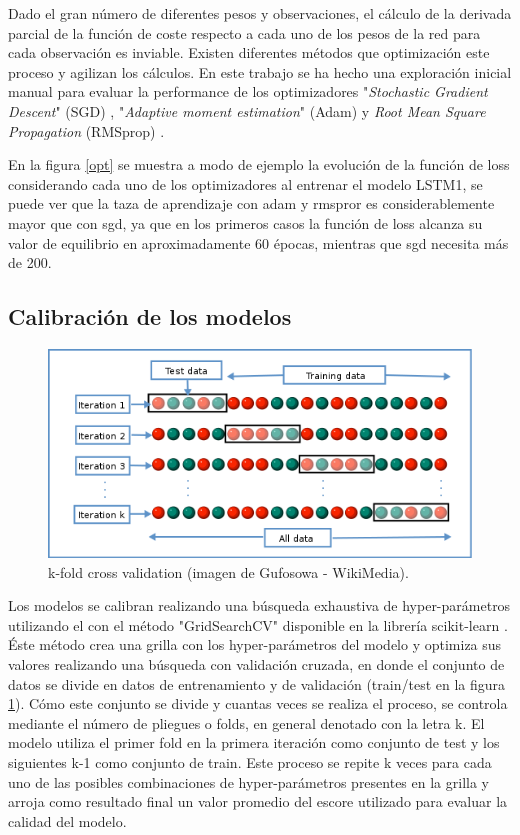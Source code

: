 Dado el gran número de diferentes pesos y observaciones, el cálculo de la derivada parcial de la función de coste 
respecto a cada uno de los pesos de la red para cada observación es inviable. Existen diferentes métodos que optimización
este proceso y agilizan los cálculos. En este trabajo se ha hecho una exploración inicial manual para evaluar 
la performance de los optimizadores 
"\textit{Stochastic Gradient Descent}" (SGD) \cite{optim}, "\textit{Adaptive moment estimation}" (Adam) \cite{adam} y 
\textit{Root Mean Square Propagation} (RMSprop) \cite{optim}.



En la figura \ref{opt} se muestra a modo de ejemplo la evolución de la función de loss considerando cada uno de los 
optimizadores al entrenar el modelo LSTM1, se puede ver que la taza de aprendizaje con adam y rmspror es considerablemente
mayor que con sgd, ya que en los primeros casos la función de loss alcanza su valor de equilibrio en aproximadamente 
60 épocas, mientras que sgd necesita más de 200. 



\subsection{Calibración de los modelos}
\label{cal}

\begin{figure}[h!]
  \begin{center}
    \includegraphics[height=2.in]{Figures/GridsearchCV.png}
    \caption{ k-fold cross validation (imagen de Gufosowa - WikiMedia).}
    \label{KCV}
  \end{center}
\end{figure}


Los modelos se calibran realizando una búsqueda exhaustiva de hyper-parámetros utilizando el 
con el método "GridSearchCV" disponible en la librería scikit-learn \cite{scikit}.
Éste método crea una grilla con los hyper-parámetros del modelo y optimiza sus valores realizando una búsqueda
 con validación cruzada, en donde el conjunto de datos se divide en datos de entrenamiento y de validación 
 (train/test en la figura \ref{KCV}).  Cómo este conjunto se divide y cuantas veces se realiza el proceso, se controla mediante el 
 número de pliegues o folds, en general denotado con la letra k.
 El modelo utiliza el primer fold en la primera iteración como conjunto de test y 
 los siguientes k-1 como conjunto de train. Este proceso se repite k veces para cada uno de las posibles 
 combinaciones de hyper-parámetros presentes en la grilla y arroja como resultado final un valor promedio 
 del escore utilizado para evaluar  la calidad del modelo. 

